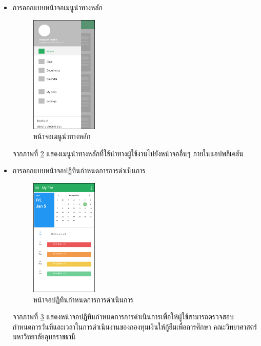 \begin{enumerate}
\begin{itemize}
\begin{itemize}
\begin{figure}[H]
					\caption{หน้าจอข่าวสารและประชาสัมพันธ์}
					\label{Fig:home_feed}
				\end{figure}
				จากภาพที่ \ref{Fig:home_feed} แสดงหน้าจอข่าวสารหรือประชาสัมพันธ์จากเจ้าหน้าที่หรือผู้ที่เกี่ยวข้อง
				\item การออกแบบหน้าจอเมนูนำทางหลัก 
				\begin{figure}[H]
					\centering
					\includegraphics[width=0.3\textwidth]{Figures/3/UIMobile/home_drawer_nav}
					\caption{หน้าจอเมนูนำทางหลัก}
					\label{Fig:home_drawer_nav}
				\end{figure}
				จากภาพที่ \ref{Fig:home_drawer_nav} แสดงเมนูนำทางหลักที่ใช้นำทางผู้ใช้งานไปยังหน้าจออื่นๆ ภายในแอปพลิเคชัน
				\item การออกแบบหน้าจอปฏิทินกำหนดการการดำเนินการ
				\begin{figure}[H]
					\centering
					\includegraphics[width=0.3\textwidth]{Figures/3/UIMobile/home_calendar}
					\caption{หน้าจอปฏิทินกำหนดการการดำเนินการ}
					\label{Fig:home_calendar}
				\end{figure}
				จากภาพที่ \ref{Fig:home_calendar} แสดงหน้าจอปฏิทินกำหนดการการดำเนินการเพื่อให้ผู้ใช้สามารถตรวจสอบกำหนดการวันที่และเวลาในการดำเนินงานของกองทุนเงินให้กู้ยืมเพื่อการศึกษา คณะวิทยาศาสตร์ มหาวิทยาลัยอุบลราชธานี

\end{itemize}
\end{itemize}
\end{enumerate}

